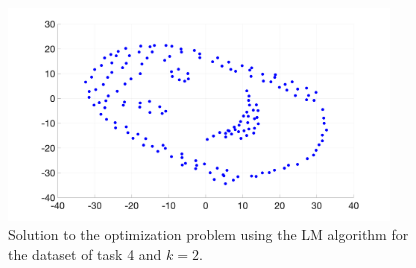 \documentclass[12pt]{article}
\begin{document}
\begin{figure}[ht!]
	\centering
	\includegraphics[width=0.9\textwidth]{figures/task4_sol.png}
	\caption{Solution to the optimization problem using the LM algorithm for the dataset of task 4 and $k=2$.}
	\label{fig:task4_sol}
\end{figure}
\end{document}
